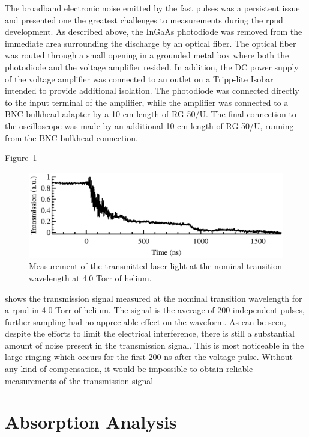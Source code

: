 The broadband electronic noise emitted by the fast pulses was a persistent issue
and presented one the greatest challenges to measurements during the \acs{rpnd}
development. As described above, the InGaAs photodiode was removed from the
immediate area surrounding the discharge by an optical fiber. The optical fiber
was routed through a small opening in a grounded metal box where both the
photodiode and the voltage amplifier resided. In addition, the DC power supply
of the voltage amplifier was connected to an outlet on a Tripp-lite Isobar
intended to provide additional isolation. The photodiode was connected directly
to the input terminal of the amplifier, while the amplifier was connected to a
BNC bulkhead adapter by a 10 cm length of RG 50/U. The final connection to the
oscilloscope was made by an additional 10 cm length of RG 50/U, running from the
BNC bulkhead connection.

Figure~\ref{fig:transmitted}
\begin{figure}
  \centering
  \includegraphics{./chapters/metastables/figures/transmitted.eps}
  \caption{Measurement of the transmitted laser light at the nominal transition
  wavelength at 4.0 Torr of helium.}
  \label{fig:transmitted}
\end{figure}
shows the transmission signal measured at the nominal transition wavelength for
a \acs{rpnd} in 4.0 Torr of helium. The signal is the average of 200 independent
pulses, further sampling had no appreciable effect on the waveform. As can be
seen, despite the efforts to limit the electrical interference, there is still a
substantial amount of noise present in the transmission signal. This is most
noticeable in the large ringing which occurs for the first 200 ns after the
voltage pulse. Without any kind of compensation, it would be impossible to
obtain reliable measurements of the transmission signal

\section{Absorption Analysis}

